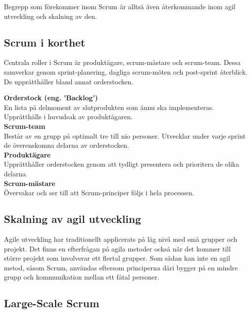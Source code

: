		Begrepp som förekommer inom Scrum är alltså även återkommande inom agil utveckling och skalning av den.
		
	\subsection{Scrum i korthet}	
		
		Centrala roller i Scrum är produktägare, scrum-mästare och scrum-team. Dessa samverkar genom sprint-planering, dagliga scrum-möten och post-sprint återblick. De upprätthåller bland annat orderstocken.
		
		\textbf{Orderstock (eng. 'Backlog')} \\
		En lista på delmoment av slutprodukten som ännu ska implementeras. Upprätthålls i huvudsak av produktägaren. \\	
		
		\textbf{Scrum-team} \\
		Består av en grupp på optimalt tre till nio personer. Utvecklar under varje sprint de överenskomna delarna av orderstocken. \\
		
		\textbf{Produktägare} \\
		Upprätthåller orderstocken genom att tydligt presentera och prioritera de olika delarna. \\
		
		\textbf{Scrum-mästare} \\
		Övervakar och ser till att Scrum-principer följs i hela processen. \\
		
		\cite{scrum_guide}
		

	\subsection{Skalning av agil utveckling}
		
		Agile utveckling har traditionellt applicerats på låg nivå med små grupper och projekt. Det finns en efterfrågan på agila metoder också när det kommer till större projekt som involverar ett flertal grupper. Som sådan kan inte en agil metod, såsom Scrum, användas eftersom principerna däri bygger på en mindre grupp och kommunikation mellan ett fåtal personer.
	
	\subsection{Large-Scale Scrum}
	
